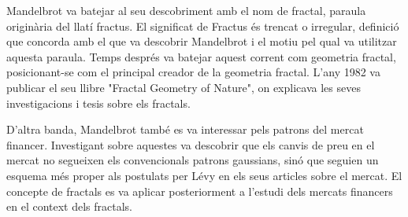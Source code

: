 \documentclass[12pt,a4paper]{report}
\begin{document}
Mandelbrot va batejar al seu descobriment amb el nom de fractal, paraula originària del llatí fractus. El significat de Fractus és trencat o irregular, definició que concorda amb el que va descobrir Mandelbrot i el motiu pel qual va utilitzar aquesta paraula. Temps després va batejar aquest corrent com geometria fractal, posicionant-se com el principal creador de la geometria fractal. L'any 1982 va publicar el seu llibre "Fractal Geometry of Nature", on explicava les seves investigacions i tesis sobre els fractals.

D’altra banda, Mandelbrot també es va interessar pels patrons del mercat financer. Investigant sobre aquestes va descobrir que els canvis de preu en el mercat no segueixen els convencionals patrons gaussians, sinó que seguien un esquema més proper als postulats per Lévy en els seus articles sobre el mercat. El concepte de fractals es va aplicar posteriorment a l'estudi dels mercats financers en el context dels fractals. 
\end{document}
